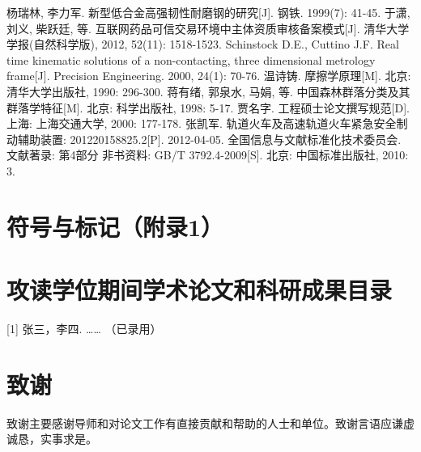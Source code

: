 \documentclass[UTF8,a4paper,12pt]{ctexart}
\numberwithin{equation}{section}
\begin{document}
\renewcommand\refname{参\quad 考\quad 文\quad 献}
\begin{thebibliography}{1}
 杨瑞林, 李力军. 新型低合金高强韧性耐磨钢的研究[J]. 钢铁. 1999(7): 41-45.
 于潇, 刘义, 柴跃廷, 等. 互联网药品可信交易环境中主体资质审核备案模式[J]. 清华大学学报(自然科学版), 2012, 52(11): 1518-1523.
 Schinstock D.E., Cuttino J.F. Real time kinematic solutions of a non-contacting, three dimensional metrology frame[J]. Precision Engineering. 2000, 24(1): 70-76. 
 温诗铸. 摩擦学原理[M]. 北京: 清华大学出版社, 1990: 296-300.
 蒋有绪, 郭泉水, 马娟, 等. 中国森林群落分类及其群落学特征[M]. 北京: 科学出版社, 1998: 5-17.
 贾名字. 工程硕士论文撰写规范[D]. 上海: 上海交通大学, 2000: 177-178.
 张凯军. 轨道火车及高速轨道火车紧急安全制动辅助装置: 201220158825.2[P]. 2012-04-05.
 全国信息与文献标准化技术委员会. 文献著录: 第4部分 非书资料: GB/T 3792.4-2009[S]. 北京: 中国标准出版社, 2010: 3.
\end{thebibliography}%

\newpage
{}

\section*{符号与标记（附录1）}

\newpage
{}

\section*{攻读学位期间学术论文和科研成果目录}

[1] 张三，李四. …… （已录用）

\newpage
{}

\section*{致\qquad 谢}

\hspace{8mm}致谢主要感谢导师和对论文工作有直接贡献和帮助的人士和单位。致谢言语应谦虚诚恳，实事求是。
\end{document}

